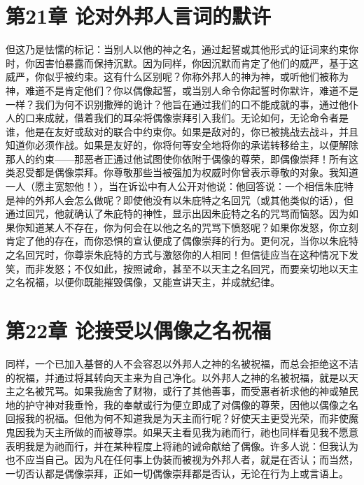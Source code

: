 
\section{第21章 论对外邦人言词的默许}

但这乃是怯懦的标记：当别人以他的神之名，通过起誓或其他形式的证词来约束你时，你因害怕暴露而保持沉默。因为同样，你因沉默而肯定了他们的威严，基于这威严，你似乎被约束。这有什么区别呢？你称外邦人的神为神，或听他们被称为神，难道不是肯定他们？你以偶像起誓，或当别人命令你起誓时你默许，难道不是一样？我们为何不识别撒殚的诡计？他旨在通过我们的口不能成就的事，通过他仆人的口来成就，借着我们的耳朵将偶像崇拜引入我们。无论如何，无论命令者是谁，他是在友好或敌对的联合中约束你。如果是敌对的，你已被挑战去战斗，并且知道你必须作战。如果是友好的，你将何等安全地将你的承诺转移给主，以便解除那人的约束——那恶者正通过他试图使你依附于偶像的尊荣，即偶像崇拜！所有这类忍受都是偶像崇拜。你尊敬那些当被强加为权威时你曾表示尊敬的对象。我知道一人（愿主宽恕他！），当在诉讼中有人公开对他说：他回答说：一个相信朱庇特是神的外邦人会怎么做呢？即使他没有以朱庇特之名回咒（或其他类似的话），但通过回咒，他就确认了朱庇特的神性，显示出因朱庇特之名的咒骂而恼怒。因为如果你知道某人不存在，你为何会在以他之名的咒骂下愤怒呢？如果你发怒，你立刻肯定了他的存在，而你恐惧的宣认便成了偶像崇拜的行为。更何况，当你以朱庇特之名回咒时，你尊崇朱庇特的方式与激怒你的人相同！但信徒应当在这种情况下发笑，而非发怒；不仅如此，按照诫命，甚至不以天主之名回咒，而要亲切地以天主之名祝福，以便你既能摧毁偶像，又能宣讲天主，并成就纪律。\par


\section{第22章 论接受以偶像之名祝福}

同样，一个已加入基督的人不会容忍以外邦人之神的名被祝福，而总会拒绝这不洁的祝福，并通过将其转向天主来为自己净化。以外邦人之神的名被祝福，就是以天主之名被咒骂。如果我施舍了财物，或行了其他善事，而受惠者祈求他的神或殖民地的护守神对我垂怜，我的奉献或行为便立即成了对偶像的尊荣，因他以偶像之名回报我的祝福。但他为何不知道我是为天主而行呢？好使天主更受光荣，而非使魔鬼因我为天主所做的而被尊崇。如果天主看见我为祂而行，祂也同样看见我不愿意表明我是为祂而行，并在某种程度上将祂的诫命献给了偶像。许多人说：但我认为也不应当自己。因为凡在任何事上伪装而被视为外邦人者，就是在否认；而当然，一切否认都是偶像崇拜，正如一切偶像崇拜都是否认，无论在行为上或言语上。\par

